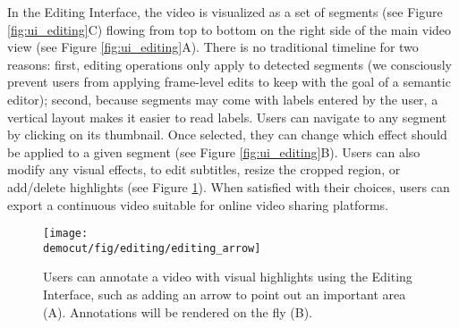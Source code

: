 In the Editing Interface, the video is visualized as a set of segments (see Figure \ref{fig:ui_editing}C) flowing from top to bottom on the right side of the main video view (see Figure \ref{fig:ui_editing}A). There is no traditional timeline for two reasons: first, editing operations only apply to detected segments (we consciously prevent users from applying frame-level edits to keep with the goal of a semantic editor); second, because segments may come with labels entered by the user, a vertical layout makes it easier to read labels. Users can navigate to any segment by clicking on its thumbnail. Once selected, they can change which effect should be applied to a given segment (see Figure \ref{fig:ui_editing}B). Users can also modify any visual effects, to edit subtitles, resize the cropped region, or add/delete highlights (see Figure \ref{fig:editing_arrow}). When satisfied with their choices, users can export a continuous video suitable for online video sharing platforms.

\begin{figure}[b!]
  \centering
  \texttt{[image: \\democut/fig/editing/editing\_arrow]}
  \caption{Users can annotate a video with visual highlights using the Editing Interface, such as adding an arrow to point out an important area (A). Annotations will be rendered on the fly (B).}
  \label{fig:editing_arrow}
\end{figure}
